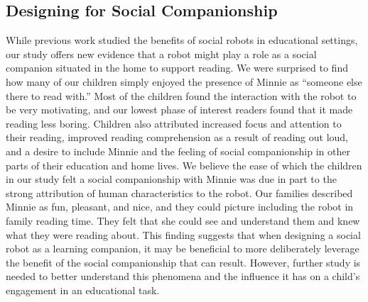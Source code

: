 \documentclass{sigchi}
\begin{document}
\subsection{Designing for Social Companionship}
While previous work studied the benefits of social robots in educational settings, our study offers new evidence that a robot might play a role as a social companion situated in the home to support reading. We were surprised to find how many of our children simply enjoyed the presence of Minnie as ``someone else there to read with.'' Most of the children found the interaction with the robot to be very motivating, and our lowest phase of interest readers found that it made reading less boring. Children also attributed increased focus and attention to their reading, improved reading comprehension as a result of reading out loud, and a desire to include Minnie and the feeling of social companionship in other parts of their education and home lives. We believe the ease of which the children in our study felt a social companionship with Minnie was due in part to the strong attribution of human characteristics to the robot. Our families described Minnie as fun, pleasant, and nice, and they could picture including the robot in family reading time. They felt that she could see and understand them and knew what they were reading about. This finding suggests that when designing a social robot as a learning companion, it may be beneficial to more deliberately leverage the benefit of the social companionship that can result. However, further study is needed to better understand this phenomena and the influence it has on a child's engagement in an educational task.
\end{document}

